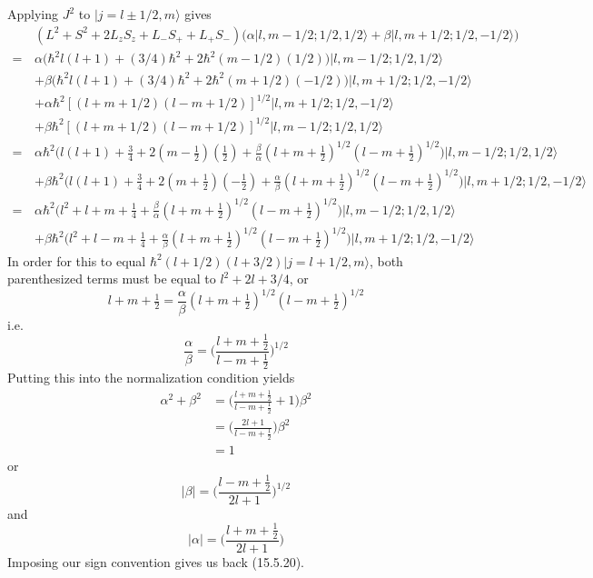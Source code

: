 \documentclass[../principles-of-quantum-mechanics.tex]{subfiles}
\begin{document}
\begin{questions}
		\begin{solution}
			Applying $J^2$ to $|j = l \pm 1/2, m\rangle$ gives
			\begin{align*}
				&(L^2 + S^2 + 2L_zS_z + L_-S_+ + L_+S_-)\big(\alpha|l, m-1/2;1/2,1/2\rangle + \beta|l,m+1/2;1/2,{-1/2}\rangle\big) \\
				=\,&\alpha\big(\hbar^2l(l + 1) + (3/4)\hbar^2 + 2\hbar^2(m - 1/2)(1/2)\big)|l, m-1/2;1/2,1/2\rangle \\
				&+ \beta\big(\hbar^2l(l + 1) + (3/4)\hbar^2 + 2\hbar^2(m + 1/2)(-1/2)\big)|l, m+1/2;1/2,{-1/2}\rangle \\
				&+ \alpha\hbar^2[(l + m + 1/2)(l - m + 1/2)]^{1/2}|l, m + 1/2; 1/2, {-1/2}\rangle \\
				&+ \beta\hbar^2[(l + m + 1/2)(l - m + 1/2)]^{1/2}|l,m - 1/2; 1/2, 1/2\rangle \\
				=\,&\alpha\hbar^2\Big(l(l + 1) + \tfrac{3}{4} + 2(m - \tfrac{1}{2})(\tfrac{1}{2}) + \frac{\beta}{\alpha}(l + m + \tfrac{1}{2})^{1/2}(l - m + \tfrac{1}{2})^{1/2}\Big)|l, m - 1/2; 1/2, 1/2\rangle \\
				&+ \beta\hbar^2\Big(l(l + 1) + \tfrac{3}{4} + 2(m + \tfrac{1}{2})({-\tfrac{1}{2}}) + \frac{\alpha}{\beta}(l + m + \tfrac{1}{2})^{1/2}(l - m + \tfrac{1}{2})^{1/2}\Big)|l, m + 1/2; 1/2, {-1/2}\rangle \\
				=\,&\alpha\hbar^2\Big(l^2 + l + m + \tfrac{1}{4} + \frac{\beta}{\alpha}(l + m + \tfrac{1}{2})^{1/2}(l - m + \tfrac{1}{2})^{1/2}\Big)|l, m - 1/2; 1/2, 1/2\rangle \\
				&+ \beta\hbar^2\Big(l^2 + l - m + \tfrac{1}{4} + \frac{\alpha}{\beta}(l + m + \tfrac{1}{2})^{1/2}(l - m + \tfrac{1}{2})^{1/2}\Big)|l, m + 1/2; 1/2, {-1/2}\rangle
			\end{align*}
			In order for this to equal $\hbar^2(l + 1/2)(l + 3/2)|j = l + 1/2, m\rangle$, both parenthesized terms must be equal to $l^2 + 2l + 3/4$, or
			$$l + m + \tfrac{1}{2} = \frac{\alpha}{\beta}(l + m + \tfrac{1}{2})^{1/2}(l - m + \tfrac{1}{2})^{1/2}$$
			i.e.
			$$\frac{\alpha}{\beta} = \Big(\frac{l + m + \tfrac{1}{2}}{l - m + \tfrac{1}{2}}\Big)^{1/2}$$
			Putting this into the normalization condition yields
			\begin{align*}
				\alpha^2 + \beta^2 &= \Big(\frac{l + m + \tfrac{1}{2}}{l - m + \tfrac{1}{2}} + 1\Big)\beta^2 \\
				&= \Big(\frac{2l + 1}{l - m + \tfrac{1}{2}}\Big)\beta^2 \\
				&= 1
			\end{align*}
			or
			$$|\beta| = \Big(\frac{l - m + \tfrac{1}{2}}{2l + 1}\Big)^{1/2}$$
			and
			$$|\alpha| = \Big(\frac{l + m + \tfrac{1}{2}}{2l + 1}\Big)$$
			Imposing our sign convention gives us back (15.5.20).
		\end{solution}
	

\end{questions}
\end{document}
